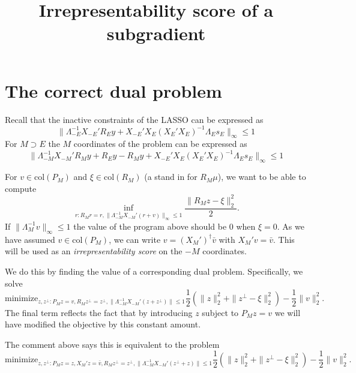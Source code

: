 \documentclass{article}
\title{ {\bf Irrepresentability score of a subgradient}}
\author{}
\begin{document}
	\maketitle \RaggedRight

        
        \section{The correct dual problem}

       Recall that the inactive constraints of the
          LASSO can be expressed as
          \begin{equation}
            \label{eq:inactive}
            \|\Lambda_{-E}^{-1}X_{-E}'R_Ey + X_{-E}'X_E(X_E'X_E)^{-1}\Lambda_Es_E\|_{\infty}
            \leq 1
            \end{equation}
          For $M \supset E$ the $M$ coordinates of the problem can be expressed as
          \begin{equation}
            \label{eq:inactive}
            \|\Lambda_{-M}^{-1}X_{-M}'R_My + R_Ey-R_My + X_{-E}'X_E(X_E'X_E)^{-1}\Lambda_Es_E\|_{\infty}
            \leq 1
            \end{equation}
          
          For $v \in \text{col}(P_M)$ and $\xi \in \text{col}(R_M)$ (a stand in for $R_M\mu$), we want to be able to compute
          \begin{equation}
            \label{eq:LD}
          \inf_{r: R_Mr=r,  \|\Lambda_{-M}^{-1}X_{-M}'(r + v)\|_{\infty}
            \leq 1} \frac{\|R_Mz - \xi\|^2_2}{2}.
          \end{equation}
          If $\|\Lambda_M^{-1}v\|_{\infty} \leq 1$ the value of the program above should be 0 when $\xi=0$.
          As we have assumed $v \in \text{col}(P_M)$, we can write $v=(X_M')^{\dagger}\bar{v}$ with $X_M'v=\bar{v}$.
          This will be used as an {\em irrepresentability score} on the $-M$ coordinates.

          We do this by finding the value of a corresponding dual problem. Specifically, we solve
          $$
          \text{minimize}_{z,z^{\perp}: P_Mz=v, R_Mz^{\perp}=z^{\perp}, \|\Lambda_{-M}^{-1}X_{-M}'(z+z^{\perp})\| \leq 1} \frac{1}{2} \left(\|z\|^2_2 + \|z^{\perp}-\xi\|^2_2 \right) - \frac{1}{2} \|v\|^2_2.
          $$
          The final term reflects the fact that by introducing $z$ subject to $P_Mz=v$ we will have modified
          the objective by this constant amount.
          
          The comment above says this is equivalent to the problem
          $$
          \text{minimize}_{z,z^{\perp}: P_Mz=z, X_M'z=\bar{v}, R_Mz^{\perp}=z^{\perp}, \|\Lambda_{-M}^{-1}X_{-M}'(z^{\perp}+z)\| \leq 1} \frac{1}{2} \left(\|z\|^2_2 + \|z^{\perp}-\xi\|^2_2 \right) - \frac{1}{2} \|v\|^2_2.
          $$
          
\end{document}

